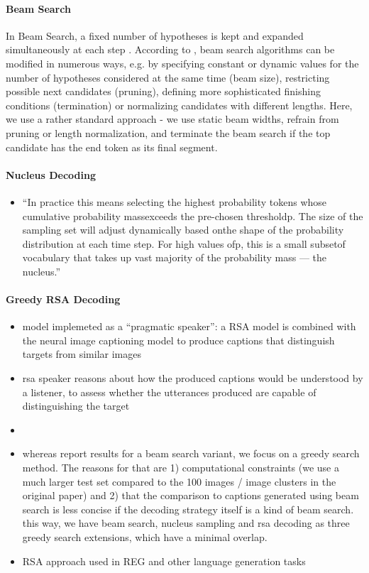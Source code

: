 \documentclass[11pt,a4paper]{article}
\begin{document}
\paragraph{Beam Search} In Beam Search, a fixed number of hypotheses is kept and expanded simultaneously at each step \citep[cf. e.g.][]{Graves2012}. According to \citet{zarriess-schlangen-2018-decoding}, beam search algorithms can be modified in numerous ways, e.g. by specifying constant or dynamic values for the number of hypotheses considered at the same time (beam size), restricting possible next candidates (pruning), defining more sophisticated finishing conditions (termination) or normalizing candidates with different lengths. Here, we use a rather standard approach - we use static beam widths, refrain from pruning or length normalization, and terminate the beam search if the top candidate has the end token as its final segment.
\paragraph{Nucleus Decoding}

\begin{itemize}
	\item \enquote{In practice this means selecting the highest probability tokens whose cumulative probability massexceeds the pre-chosen thresholdp.  The size of the sampling set will adjust dynamically based onthe shape of the probability distribution at each time step. For high values ofp, this is a small subsetof vocabulary that takes up vast majority of the probability mass — the nucleus.} \citet{Holtzman2019}
\end{itemize}

\paragraph{Greedy RSA Decoding}

\begin{itemize}
	\item model implemeted as a \enquote{pragmatic speaker}: a RSA model is combined with the neural image captioning model to produce captions that distinguish targets from similar images
	\item rsa speaker reasons about how the produced captions would be understood by a listener, to assess whether the utterances produced are capable of distinguishing the target
	\item \citet{Cohn-Gordon2018}
	\item whereas \citet{Cohn-Gordon2018} report results for a beam search variant, we focus on a greedy search method. The reasons for that are 1) computational constraints (we use a much larger test set compared to the 100 images / image clusters in the original paper) and 2) that the comparison to captions generated using beam search is less concise if the decoding strategy itself is a kind of beam search. this way, we have beam search, nucleus sampling and rsa decoding as three greedy search extensions, which have a minimal overlap. 
	\item RSA approach used in REG \citep{zarriess-schlangen-2019-know} and other language generation tasks \citep{Shen2019}
\end{itemize}
\end{document}
